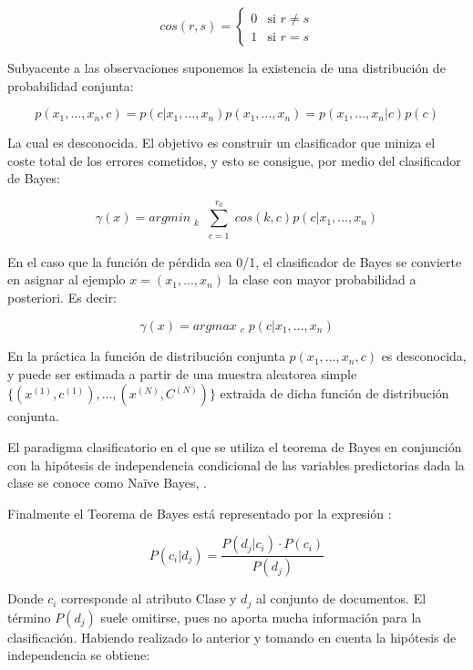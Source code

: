 	\[ cos(r, s) = \left \{ \begin{matrix} 0 & \mbox{si }r \ne s
\\ 1 & \mbox{si }r = s \end{matrix}\right. \]

	Subyacente a las observaciones suponemos la existencia de una distribución de probabilidad conjunta:

	\[
		p(x_{1}, ..., x_{n}, c) = p(c | x_{1}, ..., x_{n})p(x_{1}, ..., x_{n}) = p(x_{1}, ..., x_{n}|c)p(c)
	\]

	La cual es desconocida. El objetivo es construir un clasificador que miniza el coste total de los errores cometidos, y esto se consigue, \cite{NaiveBayes3} por medio del clasificador de Bayes:

	\[
		\gamma(x) = arg min_{\substack{k}} \sum^{r_{0}}_{\substack{c = 1}} cos(k,c)p(c | x_{1}, ..., x_{n})
	\]

	En el caso que la función de pérdida sea 0/1, el clasificador de Bayes se convierte en asignar al ejemplo \begin{math} x = (x_{1}, ..., x_{n})\end{math} la clase con mayor probabilidad a posteriori. Es decir:

	\[
		\gamma(x) = arg max_{\substack{c}} p(c | x_{1}, ..., x_{n})
	\]

	En la práctica la función de distribución conjunta \begin{math} p(x_{1}, ..., x_{n}, c) \end{math} es desconocida, y puede ser estimada a partir de una muestra aleatorea simple \begin{math} \{ (x^{(1)}, c^{(1)} ), ..., (x^{(N)}, C^{(N)})\}\end{math} extraida de dicha función de distribución conjunta.

	El paradigma clasificatorio en el que se utiliza el teorema de Bayes en conjunción con la hipótesis de independencia condicional de las variables predictorias dada la clase se conoce como Naïve Bayes, \cite{NaiveBayes3}.

	Finalmente el Teorema de Bayes está representado por la expresión \cite{NaiveBayes4}:

	\[
		P(c_{i}|d_{j}) = \frac{P(d_{j}|c_{i}) · P(c_{i})}{P(d_{j})}
	\]

	Donde \begin{math} c_{i} \end{math} corresponde al atributo Clase y \begin{math} d_{j} \end{math} al conjunto de documentos. El término \begin{math} P(d_{j}) \end{math} suele omitirse, pues no aporta mucha información para la clasificación. Habiendo realizado lo anterior y tomando en cuenta la hipótesis de independencia se obtiene:

